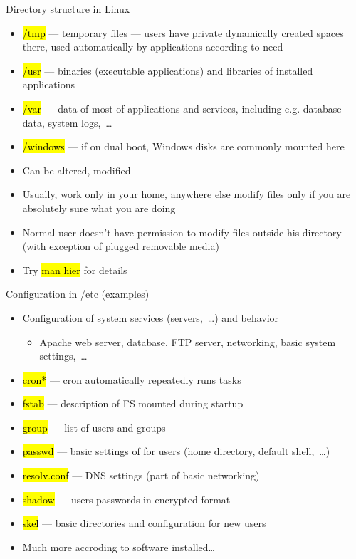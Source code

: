 \documentclass[compress, ucs, xelatex, 11pt, xcolor=svgnames,
  hyperref={
    bookmarks=true,
    unicode=true,
    colorlinks=true,
    pdftitle={Linux, command line and MetaCentrum},
    plainpages=false,
    pdfauthor={Vojtech Zeisek},
    pdfsubject={Course about use of Linux command line, writing shell scripts and using MetaCentrum of CESNET},
    pdfcreator={XeLaTeX},
    pdfkeywords={Linux, GNU, BASH, shell, command line, MetaCentrum},
    linkcolor=DarkRed,
    anchorcolor=DarkBlue,
    citecolor=Indigo,
    filecolor=NavyBlue,
    menucolor=DarkMagenta,
    urlcolor=DarkBlue,
    pdftex},
  url={hyphens, lowtilde} %
  ]{beamer}
\renewcommand{\texttt}[1]{\hl{\ttfamily #1}}
\renewcommand{\alert}[1]{\textcolor{red}{#1}}
\begin{document}
\begin{frame}[allowframebreaks]{Directory structure in Linux}
\begin{itemize}
    \item \texttt{/tmp} --- temporary files --- users have private dynamically created spaces there, used automatically by applications according to need
    \item \texttt{/usr} --- binaries (executable applications) and libraries of installed applications
    \item \alert{\texttt{/var}} --- data of most of applications and services, including e.g. database data, system logs,~\ldots
    \item \alert{\texttt{/windows}} --- if on dual boot, Windows disks are commonly mounted here
    \item Can be altered, modified
    \item Usually, work only in your home, anywhere else modify files only if you are absolutely sure what you are doing
    \item Normal user doesn't have permission to modify files outside his directory (with exception of plugged removable media)
    \item Try \texttt{man hier} for details
  \end{itemize}
\end{frame}

\begin{frame}{Configuration in /etc (examples)}
  \begin{itemize}
    \item Configuration of system services (servers,~\ldots) and behavior
    \begin{itemize}
      \item Apache web server, database, FTP server, networking, basic system settings,~\ldots
    \end{itemize}
    \item \texttt{cron*} --- cron automatically repeatedly runs tasks
    \item \texttt{fstab} --- description of FS mounted during startup
    \item \texttt{group} --- list of users and groups
    \item \texttt{passwd} --- basic settings of for users (home directory, default shell,~\ldots)
    \item \texttt{resolv.conf} ---  DNS settings (part of basic networking)
    \item \texttt{shadow} --- users passwords in encrypted format
    \item \texttt{skel} --- basic directories and configuration for new users
    \item Much more accroding to software installed\ldots
  \end{itemize}
\end{frame}
\end{document}
